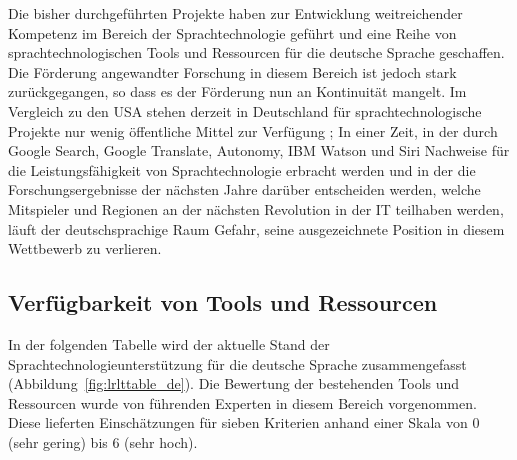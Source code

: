 \begin{multicols}{2}
Die bisher durchgeführten Projekte haben zur Entwicklung weitreichender Kompetenz im Bereich der Sprachtechnologie geführt und eine Reihe von sprachtechnologischen Tools und Ressourcen für die deutsche Sprache geschaffen. 
Die Förderung angewandter Forschung in diesem Bereich ist jedoch stark zurückgegangen, so dass es der Förderung nun an Kontinuität mangelt. 
Im Vergleich zu den USA stehen derzeit in Deutschland für sprachtechnologische Projekte nur wenig öffentliche Mittel zur Verfügung \cite{laz1}; 
In einer Zeit, in der durch Google Search, Google Translate, Autonomy, IBM Watson und Siri Nachweise für die Leistungsfähigkeit von Sprachtechnologie erbracht werden und in der die Forschungsergebnisse der nächsten Jahre darüber entscheiden werden, welche Mitspieler und Regionen an der nächsten Revolution in der IT teilhaben werden, läuft der deutschsprachige Raum Gefahr, seine ausgezeichnete Position in diesem Wettbewerb zu verlieren.

\subsection{Verfügbarkeit von Tools und Ressourcen}

In der folgenden Tabelle wird der aktuelle Stand der Sprachtechnologieunterstützung für die deutsche Sprache zusammengefasst (Abbildung~\ref{fig:lrlttable_de}). Die Bewertung der bestehenden Tools und Ressourcen wurde von führenden Experten in diesem Bereich vorgenommen. Diese lieferten Einschätzungen für sieben Kriterien anhand einer Skala von 0 (sehr gering) bis 6 (sehr hoch).


\end{multicols}
